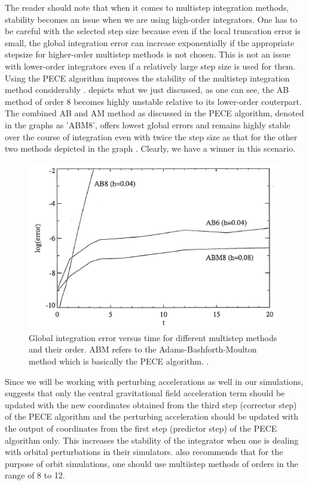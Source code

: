The reader should note that when it comes to multistep integration methods, stability becomes an issue when we are using high-order integrators. One has to be careful with the selected step size because even if the local truncation error is small, the global integration error can increase exponentially if the appropriate stepsize for higher-order multistep methods is not chosen. This is not an issue with lower-order integrators even if a relatively large step size is used for them. Using the \gls{PECE} algorithm improves the stability of the multistep integration method considerably \cite{gillbook}.  depicts what we just discussed, as one can see, the \gls{AB} method of order 8 becomes highly unstable relative to its lower-order couterpart. The combined \gls{AB} and \gls{AM} method as discussed in the \gls{PECE} algorithm, denoted in the graphs as 'ABM8', offers lowest global errors and remains highly stable over the course of integration even with twice the step size as that for the other two methods depicted in the graph \cite{gillbook}. Clearly, we have a winner in this scenario.
%
\begin{figure}[h]
\centering
\captionsetup{justification=centering}
\includegraphics[scale=1]{multi.png}
\caption{Global integration error versus time for different multistep methods and their order. ABM refers to the Adams-Bashforth-Moulton method which is basically the \gls{PECE} algorithm. \cite{gillbook}.}
\label{fig:multi}
\end{figure}
\FloatBarrier
%
Since we will be working with perturbing accelerations as well in our simulations, \cite{gillbook} suggests that only the central gravitational field acceleration term should be updated with the new coordinates obtained from the third step (corrector step) of the \gls{PECE} algorithm and the perturbing acceleration should be updated with the output of coordinates from the first step (predictor step) of the \gls{PECE} algorithm only. This increases the stability of the integrator when one is dealing with orbital perturbations in their simulators. \cite{gillbook} also recommends that for the purpose of orbit simulations, one should use multiistep methods of orders in the range of 8 to 12.

